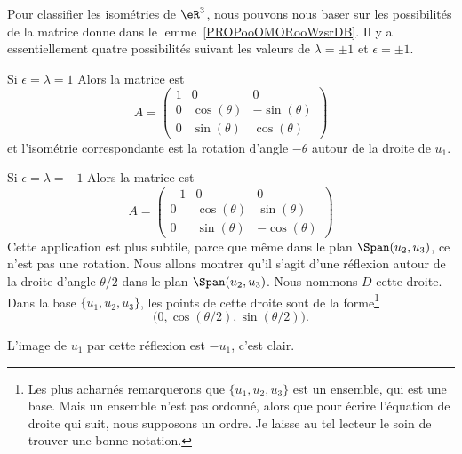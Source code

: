 Pour classifier les isométries de \( \eR^3\), nous pouvons nous baser sur les possibilités de la matrice donne dans le lemme~\ref{PROPooOMORooWzsrDB}. Il y a essentiellement quatre possibilités suivant les valeurs de \( \lambda=\pm 1\) et \( \epsilon=\pm 1\).

\begin{subproof}
    \item[Si \( \epsilon=\lambda=1\)] Alors la matrice est
    \begin{equation}
        A=\begin{pmatrix}
            1    &   0    &   0    \\
            0    &   \cos(\theta)    &   -\sin(\theta)    \\
            0    &   \sin(\theta)    &   \cos(\theta)
        \end{pmatrix}
    \end{equation}
    et l'isométrie correspondante est la rotation d'angle \( -\theta\) autour de la droite de \( u_1\).

    \item[Si \( \epsilon=\lambda=-1\)]
    Alors la matrice est
    \begin{equation}
        A=\begin{pmatrix}
            -1    &  0     &   0    \\
            0    &   \cos(\theta)    &   \sin(\theta)    \\
            0    &   \sin(\theta)    &   -\cos(\theta)
        \end{pmatrix}
    \end{equation}
    Cette application est plus subtile, parce que même dans le plan \( \Span(u_2,u_3)\), ce n'est pas une rotation. Nous allons montrer qu'il s'agit d'une réflexion autour de la droite d'angle \( \theta/2\) dans le plan \( \Span(u_2,u_3)\). Nous nommons \( D\) cette droite. Dans la base \( \{ u_1,u_2,u_3 \}\), les points de cette droite sont de la forme\footnote{Les plus acharnés remarquerons que \( \{ u_1,u_2,u_3 \}\) est un ensemble, qui est une base. Mais un ensemble n'est pas ordonné, alors que pour écrire l'équation de droite qui suit, nous supposons un ordre. Je laisse au tel lecteur le soin de trouver une bonne notation.}
    \begin{equation}
        \big( 0,\cos(\theta/2),\sin(\theta/2) \big).
    \end{equation}

    L'image de \( u_1\) par cette réflexion est \(-u_1\), c'est clair.


\end{subproof}
